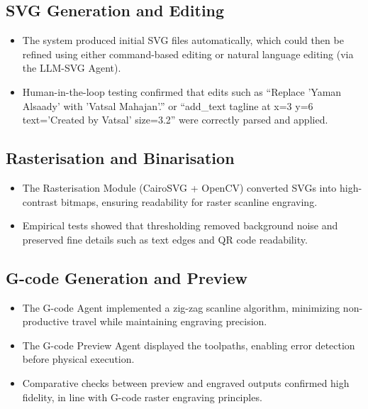 \subsection{SVG Generation and Editing}
\begin{itemize}
	\item The system produced initial SVG files automatically, which could then be refined using either command-based editing or natural language editing (via the LLM-SVG Agent).
	\item Human-in-the-loop testing confirmed that edits such as “Replace 'Yaman Alsaady' with 'Vatsal Mahajan'.” or “add\_text tagline at x=3 y=6 text='Created by Vatsal' size=3.2” were correctly parsed and applied.
\end{itemize}

\subsection{Rasterisation and Binarisation}
\begin{itemize}
	\item The Rasterisation Module (CairoSVG + OpenCV) converted SVGs into high-contrast bitmaps, ensuring readability for raster scanline engraving.
	\item Empirical tests showed that thresholding removed background noise and preserved fine details such as text edges and QR code readability.
\end{itemize}

\subsection{G-code Generation and Preview}
\begin{itemize}
	\item The G-code Agent implemented a zig-zag scanline algorithm, minimizing non-productive travel while maintaining engraving precision.
	\item The G-code Preview Agent displayed the toolpaths, enabling error detection before physical execution.
	\item Comparative checks between preview and engraved outputs confirmed high fidelity, in line with G-code raster engraving principles.
\end{itemize}

